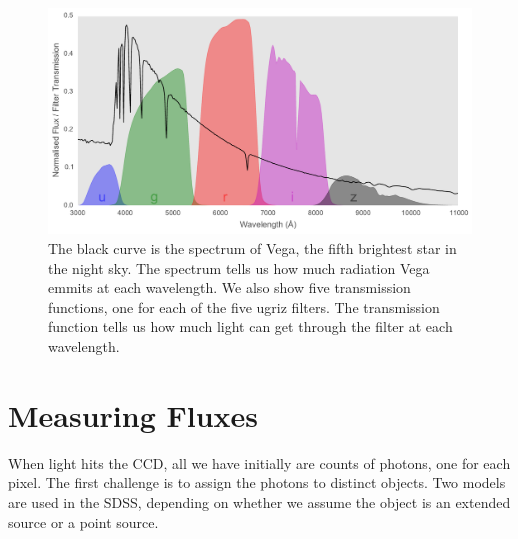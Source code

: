 \begin{figure}[tbp]
	\centering
	\includegraphics[width=\textwidth]{figures/2_astro/vega_filters_and_spectrum}
	\caption[The spectrum of the star Vega and the ugriz bandpasses]{The black curve
		is the spectrum of Vega, the fifth brightest star in the night sky. The spectrum
		tells us how much radiation Vega emmits at each wavelength. We also show five
		transmission functions, one for each of the five ugriz filters. The transmission
		function tells us how much light can get through the filter at each wavelength.}
	\label{fig:vega} 
\end{figure}


\section{Measuring Fluxes}
\label{sec:mag}
When light hits the CCD, all we have initially are counts of photons, one for each pixel.
The first challenge is to assign the photons to distinct objects. Two models are used
in the SDSS, depending on whether we assume the object is an extended source or a point source.


